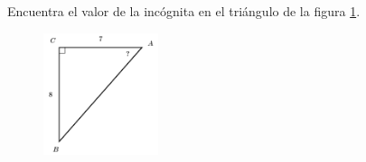 \question[15]  Encuentra el valor de la incógnita en el triángulo de la figura \ref{fig:angle_functrig_26}.
\begin{figure}[H]
    \begin{center}
        \includegraphics[width=0.3\textwidth]{../images/angle_functrig_26.png}
    \end{center}
    \caption{}
    \label{fig:angle_functrig_26}
\end{figure}